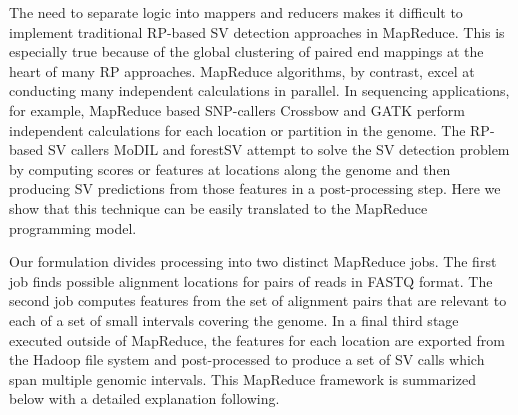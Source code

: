 \documentclass[11pt]{article}
\begin{document}
The need to separate logic into mappers and reducers makes it difficult to implement traditional RP-based SV detection approaches in MapReduce. This is especially true because of the global clustering of paired end mappings at the heart of many RP approaches. MapReduce algorithms, by contrast, excel at conducting many independent calculations in parallel. In sequencing applications, for example, MapReduce based SNP-callers Crossbow \autocite{Langmead:2009p1225} and GATK \autocite{McKenna:2010p1051} perform independent calculations for each location or partition in the genome. The RP-based SV callers MoDIL \autocite{Lee:2009da} and forestSV \autocite{Michaelson:2012fj} attempt to solve the SV detection problem by computing scores or features at locations along the genome and then producing SV predictions from those features in a post-processing step. Here we show that this technique can be easily translated to the MapReduce programming model.

Our formulation divides processing into two distinct MapReduce jobs. The first job finds possible alignment locations for pairs of reads in FASTQ format. The second job computes features from the set of alignment pairs that are relevant to each of a set of small intervals covering the genome. In a final third stage executed outside of MapReduce, the features for each location are exported from the Hadoop file system and post-processed to produce a set of SV calls which span multiple genomic intervals. This MapReduce framework is summarized below with a detailed explanation following.
\end{document}

